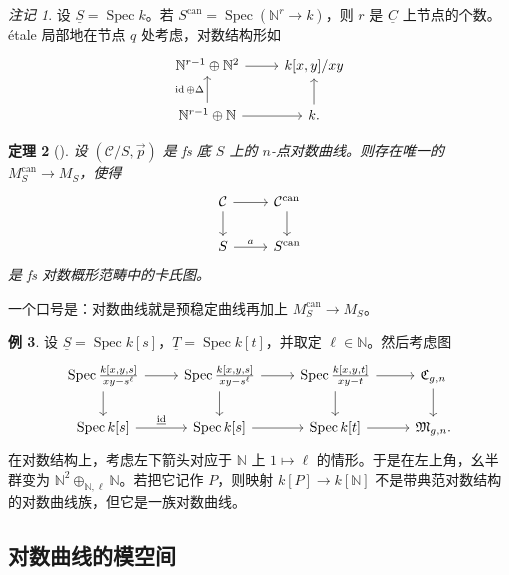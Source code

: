 \documentclass{amsart}
\newtheorem{thm}{定理}[section]
\theoremstyle{definition}
\newtheorem{exm}[thm]{例}
\theoremstyle{remark}
\newtheorem{rmk}[thm]{注记}
\theoremstyle{plain}
\theoremstyle{definition}
\theoremstyle{remark}
\newcommand{\N}{\mathbb{N}}
\newcommand{\mc}[1]{\mathcal{#1}}
\newcommand{\mf}[1]{\mathfrak{#1}}
\newcommand{\on}[1]{\operatorname{#1}}
\newcommand{\ul}[1]{\underline{#1}}
\newcommand{\1}{\mathbf{1}}
\newcommand{\2}{\mathbf{2}}
\newcommand{\3}{\mathbf{3}}
\DeclareMathOperator{\Spec}{Spec}
\begin{document}
\begin{rmk}
    设 \(\ul{S} = \Spec k\)。若 \(S^{\on{can}} = \Spec (\N^r \to k)\)，则 \(r\) 是 \(\ul{C}\) 上节点的个数。\'etale 局部地在节点 \(q\) 处考虑，对数结构形如
    \begin{equation*}
    \begin{tikzcd}
        \N^{r-1} \oplus \N^2 \ar{r} & k[x,y]/xy \\
        \N^{r-1} \oplus \N \ar{u}{\on{id}\oplus\Delta} \ar{r} & k \ar{u}.
    \end{tikzcd}
    \end{equation*}
\end{rmk}

\begin{thm}[{\cite{FKato2000}}]
    设 \((\mc{C}/S, \vec{p})\) 是 fs 底 \(S\) 上的 \(n\)-点对数曲线。则存在唯一的 \(M_S^{\on{can}} \to M_S\)，使得
    \begin{equation*}
    \begin{tikzcd}
        \mc{C} \ar{d} \ar{r} & \mc{C}^{\on{can}} \ar{d} \\
        S \ar{r}{a} & S^{\on{can}}
    \end{tikzcd}
    \end{equation*}
    是 fs 对数概形范畴中的卡氏图。
\end{thm}

一个口号是：对数曲线就是预稳定曲线再加上 \(M_S^{\on{can}} \to M_S\)。

\begin{exm}
    设 \(\ul{S} = \Spec k[s]\)，\(\ul{T} = \Spec k[t]\)，并取定 \(\ell \in \N\)。然后考虑图
    \begin{equation*}
    \begin{tikzcd}
        \Spec \frac{k{ [x,y,s] }}{xy-s^{\ell}} \ar{d} \ar{r} & \Spec \frac{k{ [x,y,s] }}{xy-s^{\ell}} \ar{d} \ar{r} & \Spec  \frac{k{[x,y,t]}}{xy-t} \ar{r}\ar{d} & \mf{C}_{g,n} \ar{d} \\
        \Spec k{[s]} \ar{r}{\ul{ \on{id} }} & \Spec {k[s]} \ar{r} & \Spec k{[t]} \ar{r} & \mf{M}_{g,n}.
    \end{tikzcd}
    \end{equation*}
    在对数结构上，考虑左下箭头对应于 \(\N\) 上 \(1 \mapsto \ell\) 的情形。于是在左上角，幺半群变为 \(\N^2 \oplus_{\N, \ell} \N\)。若把它记作 \(P\)，则映射 \(k[P] \to k[\N]\) 不是带典范对数结构的对数曲线族，但它是一族对数曲线。
\end{exm}

\subsection{对数曲线的模空间}%
\label{sub:Moduli of log curves}
\end{document}
